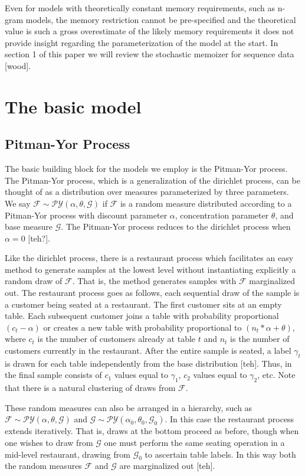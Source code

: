 \documentclass{article}
\newcommand{\F}{\mathcal{F}}
\newcommand{\PY}{\mathcal{P}\mathcal{Y}}
\newcommand{\G}{\mathcal{G}}
\begin{document}
Even for models with theoretically constant memory requirements, such as n-gram models, the memory restriction cannot be pre-specified and the theoretical value is such a gross overestimate of the likely memory requirements it does not provide insight regarding the parameterization of the model at the start.  In section 1 of this paper we will review the stochastic memoizer for sequence data [wood].

\section{The basic model}

\subsection{Pitman-Yor Process}

The basic building block for the models we employ is the Pitman-Yor process.  The Pitman-Yor process, which is a generalization of the dirichlet process, can be thought of as a distribution over measures parameterized by three parameters.   We say $\F \sim \PY(\alpha, \theta,\G)$ if $\F$ is a random measure distributed according to a Pitman-Yor process with discount parameter $\alpha$, concentration parameter $\theta$, and base measure $\G$. The Pitman-Yor process reduces to the dirichlet process when $\alpha = 0$ [teh?]. 

Like the dirichlet process, there is a restaurant process which facilitates an easy method to generate samples at the lowest level without instantiating explicitly a random draw of $\F$.  That is, the method generates samples with $\F$ marginalized out.  The restaurant process goes as follows, each sequential draw of the sample is a customer being seated at a restaurant.  The first customer sits at an empty table.  Each subsequent customer joins a table with probability proportional $(c_t - \alpha)$ or creates a new table with probability proportional to $(n_t*\alpha + \theta)$, where $c_t$ is the number of customers already at table $t$ and $n_t$ is the number of customers currently in the restaurant.  After the entire sample is seated, a label $\gamma_t$ is drawn for each table independently from the base distribution [teh].  Thus, in the final sample consists of $c_1$ values equal to $\gamma_1$, $c_2$ values equal to $\gamma_2$, etc. Note that there is a  natural clustering of draws from $\F$.

These random measures can also be arranged in a hierarchy, such as $\F \sim \PY(\alpha, \theta,\G)$ and $\G \sim \PY(\alpha_0, \theta_0, \G_0)$.  In this case the restaurant process extends iteratively.  That is, draws at the bottom proceed as before, though when one wishes to draw from $\G$ one must perform the same seating operation in a mid-level restaurant, drawing from $\G_0$ to ascertain table labels.  In this way both the random measures $\F$ and $\G$ are marginalized out [teh].
\end{document}
